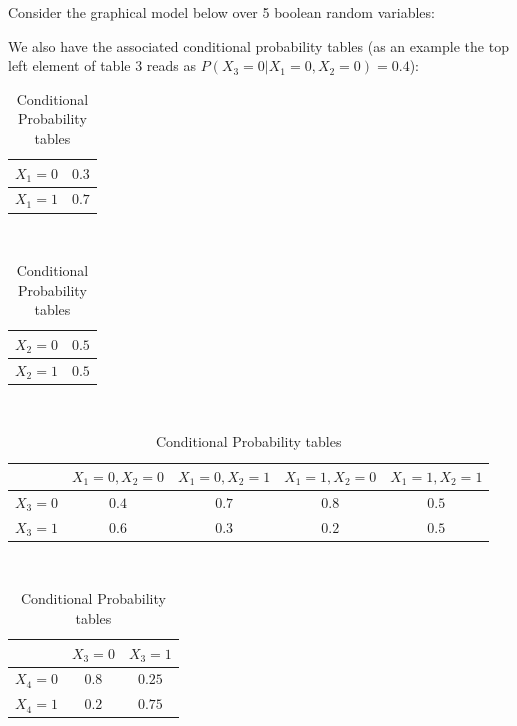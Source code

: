 \documentclass[11pt,addpoints,answers]{exam}
\begin{document}
\begin{questions}
Consider the graphical model below over 5 boolean random variables:

\begin{center}
\end{center}

We also have the associated conditional probability tables (as an example the top left element of table 3 reads as $P(X_3 = 0 | X_1 = 0, X_2 = 0) = 0.4$): \\

\begin{table}[H]
    \centering
    \begin{tabular}{|c|c|}
    \hline
         $X_1=0$ & $0.3$  \\ \hline
         $X_1=1$ & $0.7$    \\  \hline
    \end{tabular}
    \\ 
    \begin{tabular}{|c|c|}
    \hline
         $X_2=0$ & $0.5$  \\ \hline
         $X_2=1$ & $0.5$    \\  \hline
    \end{tabular}
    \\ 
    \begin{tabular}{|c|c|c|c|c|}
    \hline
            & $X_1=0, X_2=0$ & $X_1=0,X_2=1$ & $X_1=1,X_2=0$ & $X_1=1,X_2=1$   \\  \hline
        $X_3=0$ & $0.4$ & $0.7$ & $0.8$ & $0.5$ \\  \hline
        $X_3=1$ & $0.6$  & $0.3$ & $0.2$ & $0.5$    \\  \hline
    \end{tabular}
    \\
    \begin{tabular}{|c|c|c|}
    \hline
            & $X_3=0$ & $X_3=1$   \\  \hline
        $X_4=0$ & $0.8$ & $0.25$ \\  \hline
        $X_4=1$ & $0.2$  & $0.75$    \\  \hline
    \end{tabular}
    \\ 
    \caption{Conditional Probability tables}
\end{table}


\end{questions}
\end{document}
